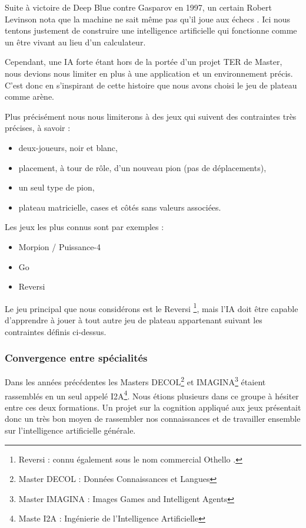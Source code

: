 Suite à victoire de Deep Blue contre Gasparov en 1997, un certain Robert Levinson nota que la machine \og ne sait même pas qu'il joue aux échecs \fg{}. Ici nous tentons justement de construire une intelligence artificielle qui fonctionne comme un être vivant au lieu d'un calculateur.

Cependant, une IA \og forte \fg{} étant hors de la portée d'un projet TER de Master, nous devions nous limiter en plus à une application et un environnement précis. C'est donc en s'inspirant de cette histoire que nous avons choisi le jeu de plateau comme arène.

Plus précisément nous nous limiterons à des jeux qui suivent des contraintes très précises, à savoir :

\begin{itemize}
\item deux-joueurs, noir et blanc,
\item placement, à tour de rôle, d'un nouveau pion (pas de déplacements),
\item un seul type de pion,
\item plateau matricielle, cases et côtés sans valeurs associées.
\end{itemize}

Les jeux les plus connus sont par exemples :

\begin{itemize}
\item Morpion / Puissance-4
\item Go
\item Reversi
\end{itemize}

Le jeu principal que nous considérons est le \og Reversi \fg{}\footnote{ \og Reversi \fg{} : connu également sous le nom commercial \og Othello \fg{}. }, mais l'IA doit être capable d'apprendre à jouer à tout autre jeu de plateau appartenant suivant les contraintes définis ci-dessus.

\subsubsection{Convergence entre spécialités }
Dans les années précédentes les Masters DECOL\footnote{ Master DECOL : \og Données Connaissances et Langues \fg{} } et IMAGINA\footnote{ Master IMAGINA : \og Images Games and Intelligent Agents \fg{} } étaient rassemblés en un seul appelé I2A\footnote { Maste I2A : \og Ingénierie de l'Intelligence Artificielle \fg{} }.
Nous étions plusieurs dans ce groupe à hésiter entre ces deux formations. Un projet sur la cognition appliqué aux jeux présentait donc un très bon moyen de rassembler nos connaissances et de travailler ensemble sur l'intelligence artificielle générale.

